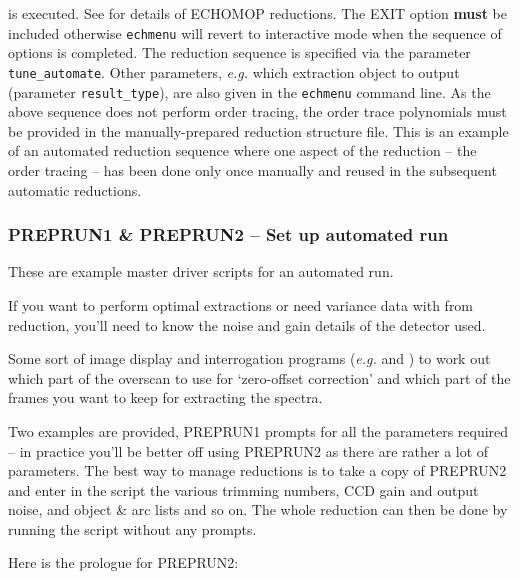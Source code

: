 \documentclass[twoside,11pt]{starlink}
\providecommand{\scspec}[2]{#1}
\begin{document}
is executed.  See  for details of ECHOMOP reductions.
The EXIT option \textbf{must} be included otherwise \texttt{echmenu} will revert to interactive mode when the sequence of options is
completed.  The reduction sequence is specified via the parameter \texttt{tune\_automate}\@.  Other parameters, {\it{e.g.}} which extraction object
to output (parameter \texttt{result\_type}), are also given in the \texttt{echmenu} command line.  As the above sequence does not perform order tracing,
the order trace polynomials must be provided in the manually-prepared
reduction structure file.  This is an example of an automated reduction
sequence where one aspect of the reduction \scspec{--}{-} the order tracing
\scspec{--}{-} has been done only once manually and reused in the subsequent
automatic reductions.


\subsubsection{\label{se_preprun}PREPRUN1 \& PREPRUN2
               \scspec{--}{-} Set up automated run}


These are example master driver scripts for an automated run.

If you want to perform optimal extractions or need variance data with
from reduction,  you'll need to know the noise and gain details of the
detector used.

Some sort of image display and interrogation programs ({\it{e.g.}}
  and
) to work out which part of the overscan to use for
`zero-offset correction' and which part of the frames you want to keep for
extracting the spectra.

Two examples are provided, PREPRUN1 prompts for all the parameters required
\scspec{--}{-} in practice you'll be better off using PREPRUN2 as there are
rather a lot of parameters.  The best way to manage reductions is to take a
copy of PREPRUN2 and enter in the script the various trimming numbers,
CCD gain and output noise, and object \& arc lists and so on.  The whole
reduction can then be done by running the script without any prompts.

Here is the prologue for PREPRUN2:
\end{document}
